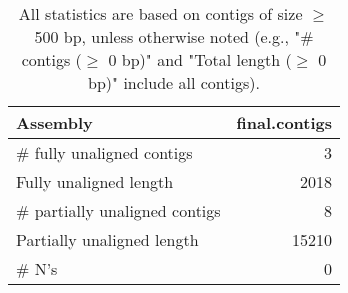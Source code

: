 \documentclass[12pt,a4paper]{article}
\begin{document}
\begin{table}[ht]
\begin{center}
\caption{All statistics are based on contigs of size $\geq$ 500 bp, unless otherwise noted (e.g., "\# contigs ($\geq$ 0 bp)" and "Total length ($\geq$ 0 bp)" include all contigs).}
\begin{tabular}{|l*{1}{|r}|}
\hline
Assembly & final.contigs \\ \hline
\# fully unaligned contigs & 3 \\ \hline
Fully unaligned length & 2018 \\ \hline
\# partially unaligned contigs & 8 \\ \hline
Partially unaligned length & 15210 \\ \hline
\# N's & 0 \\ \hline
\end{tabular}
\end{center}
\end{table}
\end{document}
